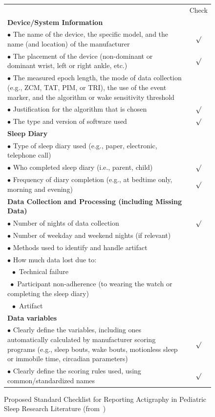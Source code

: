 \documentclass[a4paper,12pt]{article}
\newlength\savewidth
\newcommand\Ghline{%
	\noalign{\global\savewidth\arrayrulewidth\global\arrayrulewidth2pt}%
	\hline
	\noalign{\global\arrayrulewidth\savewidth}}
\begin{document}
\begin{figure}[H]
\centering
\begin{tabularx}{\textwidth}{|X|c|}
\hline
& Check \\
\Ghline
\textbf{Device/System Information} & \\
$\bullet$ The name of the device, the specific model, and the name (and location) of the manufacturer & $\surd$\\
\hline
$\bullet$ The placement of the device (non-dominant or dominant wrist, left or right ankle, etc.) & $\surd$\\
\hline
$\bullet$ The measured epoch length, the mode of data collection (e.g., ZCM, TAT, PIM, or TRI), the use of the event marker, and the algorithm or wake sensitivity threshold & \\
\hline
$\bullet$ Justification for the algorithm that is chosen & $\surd$\\
\hline
$\bullet$ The type and version of software used & $\surd$\\
\hline
\textbf{Sleep Diary} & \\
$\bullet$ Type of sleep diary used (e.g., paper, electronic, telephone call) & \\
\hline
$\bullet$ Who completed sleep diary (i.e., parent, child) & $\surd$\\
\hline
$\bullet$ Frequency of diary completion (e.g., at bedtime only, morning and evening) & $\surd$\\
\hline
\textbf{Data Collection and Processing (including Missing Data)} & \\
\hline
$\bullet$ Number of nights of data collection & $\surd$\\
\hline
$\bullet$ Number of weekday and weekend nights (if relevant) & \\
\hline
$\bullet$ Methods used to identify and handle artifact & \\
\hline
$\bullet$ How much data lost due to: & \\
$\;\; \bullet$ Technical failure & \\
$\; \bullet$ Participant non-adherence (to wearing the watch or completing the sleep diary) & \\
$\;\; \bullet$ Artifact & \\
\hline
\textbf{Data variables} & \\
\hline
$\bullet$ Clearly define the variables, including ones automatically calculated by manufacturer scoring programs (e.g., sleep bouts, wake bouts, motionless sleep or immobile time, circadian parameters) & $\surd$\\
\hline
$\bullet$ Clearly define the scoring rules used, using common/standardized names & $\surd$\\
\hline
\end{tabularx}
\caption{Proposed Standard Checklist for Reporting Actigraphy in Pediatric Sleep Research Literature (from~\cite{LisaJ.MeltzerHawleyE.Montgomery-DownsSalvatoreP.Insana2012})}
\label{checklistLisa}
\end{figure}
\end{document}

